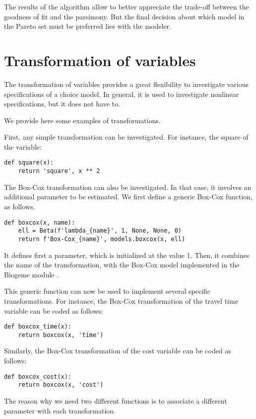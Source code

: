 \documentclass[12pt,a4paper]{article}
\begin{document}
The results of the algorithm allow to better appreciate
the trade-off between the goodness of fit and the
parsimony. But the final decision about which model in the Pareto set
must be preferred lies with
the modeler.

\section{Transformation of variables}
\label{sec:transform}

The transformation of variables provides a great flexibility to
investigate various specifications of a choice model. In general, it
is used to investigate nonlinear specifications, but it does not have
to.

We provide here some examples of transformations.

First, any simple transformation can be investigated. For instance,
the square of the variable:
\begin{lstlisting}
def square(x):
    return 'square', x ** 2
\end{lstlisting}

The Box-Cox transformation can also be investigated. In that case, it
involves an additional parameter to be estimated. We first define a
generic Box-Cox function, as follows.
\begin{lstlisting}
def boxcox(x, name):
    ell = Beta(f'lambda_{name}', 1, None, None, 0)
    return f'Box-Cox_{name}', models.boxcox(x, ell)
\end{lstlisting}
It defines first a parameter, which is initialized at the value
1. Then, it combines the name of the transformation, with the Box-Cox
model implemented in the Biogeme module \lstinline@models@.

This generic function can now be used to implement several specific
transformations. For instance, the Box-Cox transformation of the
travel time variable can be coded as follows:
\begin{lstlisting}
def boxcox_time(x):
    return boxcox(x, 'time')
\end{lstlisting}
Similarly, the Box-Cox transformation of the cost variable can be
coded as follows:
\begin{lstlisting}
def boxcox_cost(x):
    return boxcox(x, 'cost')
\end{lstlisting}
The reason why we need two different functions is to associate a
different parameter with each transformation.
\end{document}
